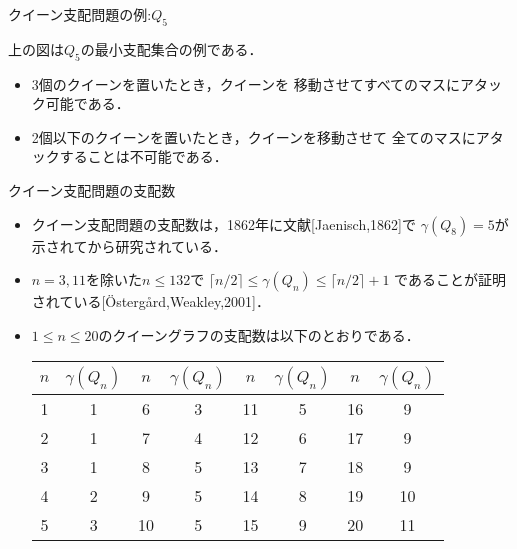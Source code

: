 \documentclass[dvipdfmx,10pt]{beamer}
\begin{document}
 
%
%

\begin{frame}{クイーン支配問題の例:$Q_5$}
  \begin{exampleblock}{}
  \begin{center}
   \scalebox{1.3}{
   
   }
  \end{center}
 \end{exampleblock}
 上の図は$Q_5$の最小支配集合の例である．
 \begin{itemize}
  \item 3個のクイーンを置いたとき，クイーンを
	移動させてすべてのマスにアタック可能である．
  \item 2個以下のクイーンを置いたとき，クイーンを移動させて
	全てのマスにアタックすることは不可能である．
 \end{itemize}
\end{frame}


%
%

\begin{frame}{クイーン支配問題の支配数}
 \begin{block}{}
  \begin{itemize}
   \item クイーン支配問題の支配数は，1862年に文献[Jaenisch,1862]で
	 $\gamma(Q_8)=5$が示されてから研究されている．
   \item $n=3,11$を除いた$n \leq 132$で $\lceil n/2 \rceil 
	 \leq \gamma(Q_{n}) \leq \lceil n/2 \rceil +1$
	 であることが証明されている[\"{O}sterg{\aa}rd,Weakley,2001]．
   \item $1\leq n \leq 20$のクイーングラフの支配数は以下のとおりである．

	 \begin{table}[hbtp]
	  \centering
	  \begin{tabular}{|c|c||c|c||c|c||c|c|} \hline
	   $n$ & $\gamma(Q_{n})$ & $n$ & $\gamma(Q_{n})$ &$n$ & $\gamma(Q_{n})$ &$n$ & $\gamma(Q_{n})$ \\ \hline
	   1 &1 &6 &3 &11 &5 &16 &9 \\ \hline
	   2 &1 &7 &4 &12 &6 &17 &9 \\ \hline
	   3 &1 &8 &5 &13 &7 &18 &9 \\ \hline
	   4 &2 &9 &5 &14 &8 &19 &10 \\ \hline
	   5 &3 &10 &5 &15 &9 &20 &11 \\ \hline
	  \end{tabular}
	 \end{table}
  \end{itemize}
 \end{block}
\end{frame}
\end{document}
